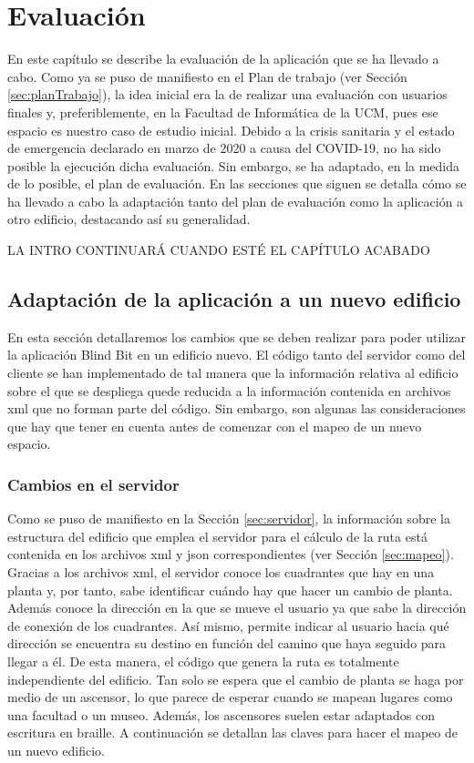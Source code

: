 \chapter{Evaluación}
\label{cap:evaluacion}

En este capítulo se describe la evaluación de la aplicación que se ha llevado a cabo. Como ya se puso de manifiesto en el Plan de trabajo (ver Sección \ref{sec:planTrabajo}), la idea inicial era la de realizar una evaluación con usuarios finales y, preferiblemente, en la Facultad de Informática de la UCM, pues ese espacio es nuestro caso de estudio inicial. Debido a la crisis sanitaria y el estado de emergencia declarado en marzo de 2020 a causa del COVID-19, no ha sido posible la ejecución dicha evaluación. Sin embargo, se ha adaptado, en la medida de lo posible, el plan de evaluación. En las secciones que siguen se detalla cómo se ha llevado a cabo la adaptación tanto del plan de evaluación como la aplicación a otro edificio, destacando así su generalidad. 

LA INTRO CONTINUARÁ CUANDO ESTÉ EL CAPÍTULO ACABADO


\section{Adaptación de la aplicación a un nuevo edificio}

En esta sección detallaremos los cambios que se deben realizar para poder utilizar la aplicación Blind Bit en un edificio nuevo. El código tanto del servidor como del cliente se han implementado de tal manera que la información relativa al edificio sobre el que se despliega quede reducida a la información contenida en archivos xml que no forman parte del código. Sin embargo, son algunas las consideraciones que hay que tener en cuenta antes de comenzar con el mapeo de un nuevo espacio. 

\subsection{Cambios en el servidor}

Como se puso de manifiesto en la Sección \ref{sec:servidor}, la información sobre la estructura del edificio que emplea el servidor para el cálculo de la ruta está contenida en los archivos xml y json correspondientes (ver Sección \ref{sec:mapeo}). Gracias a los archivos xml, el servidor conoce los cuadrantes que hay en una planta y, por tanto, sabe identificar cuándo hay que hacer un cambio de planta. Además conoce la dirección en la que se mueve el usuario ya que sabe la dirección de conexión de los cuadrantes. Así mismo, permite indicar al usuario hacia qué dirección se encuentra su destino en función del camino que haya seguido para llegar a él. De esta manera, el código que genera la ruta es totalmente independiente del edificio. Tan solo se espera que el cambio de planta se haga por medio de un ascensor, lo que parece de esperar cuando se mapean lugares como una facultad o un museo. Además, los ascensores suelen estar adaptados con escritura en braille. A continuación se detallan las claves para hacer el mapeo de un nuevo edificio.

